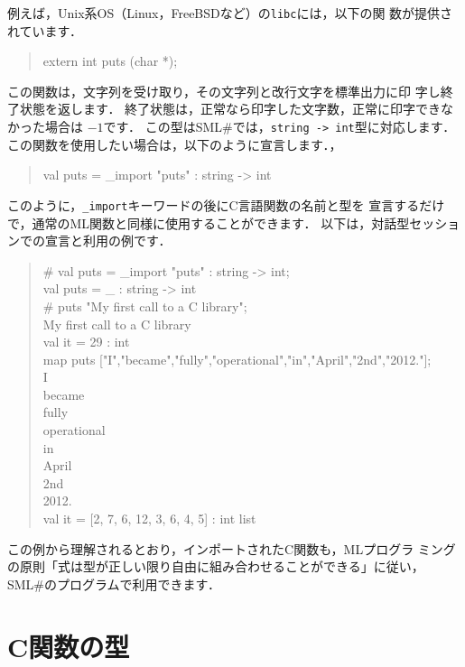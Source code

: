 \documentclass{jbook}
\newcommand{\smlsharp}{SML\#}
\newenvironment{program}{\begin{tt}\begin{quote}}{\end{quote}\end{tt}}
\begin{document}
	例えば，Unix系OS（Linux，FreeBSDなど）の{\tt libc}には，以下の関
数が提供されています．
\begin{program}
extern int puts (char *);
\end{program}
	この関数は，文字列を受け取り，その文字列と改行文字を標準出力に印
字し終了状態を返します．
	終了状態は，正常なら印字した文字数，正常に印字できなかった場合は
$-1$です．
	この型は\smlsharp{}では，{\tt string -> int}型に対応します．
	この関数を使用したい場合は，以下のように宣言します．，
\begin{program}
val puts = \_import "puts" : string -> int
\end{program}
	このように，{\tt \_import}キーワードの後にC言語関数の名前と型を
宣言するだけで，通常のML関数と同様に使用することができます．
	以下は，対話型セッションでの宣言と利用の例です．
\begin{program}
\# val puts = \_import "puts" : string -> int;\\
val puts = \_ : string -> int\\
\# puts "My first call to a C library";\\
My first call to a C library\\
val it = 29 : int\\
map puts  ["I","became","fully","operational","in","April","2nd","2012."];\\
I\\
became\\
fully\\
operational\\
in\\
April\\
2nd\\
2012.\\
val it = [2, 7, 6, 12, 3, 6, 4, 5] : int list
\end{program}
	この例から理解されるとおり，インポートされたC関数も，MLプログラ
ミングの原則「式は型が正しい限り自由に組み合わせることができる」に従い，
\smlsharp{}のプログラムで利用できます．

\section{C関数の型}
\label{sec:extensionCtype}
\end{document}
